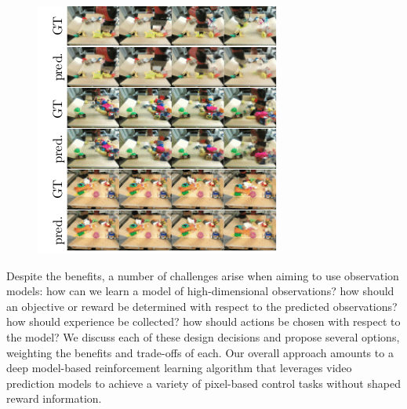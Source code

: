 \begin{figure}[t]
\centering
\includegraphics[width=.8\columnwidth,trim={3.2mm 0 0 0},clip]{images_rfr/video_prediction.pdf}
\caption{\small{}}
\label{fig:video_prediction}
\end{figure}

Despite the benefits, a number of challenges arise when aiming to use observation models: how can we learn a model of high-dimensional observations? how should an objective or reward be determined with respect to the predicted observations? how should experience be collected? how should actions be chosen with respect to the model? We discuss each of these design decisions and propose several options, weighting the benefits and trade-offs of each.
Our overall approach amounts to a deep model-based reinforcement learning algorithm that leverages video prediction models to achieve a variety of pixel-based control tasks without shaped reward information.

